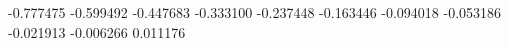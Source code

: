 -0.777475
-0.599492
-0.447683
-0.333100
-0.237448
-0.163446
-0.094018
-0.053186
-0.021913
-0.006266
0.011176

